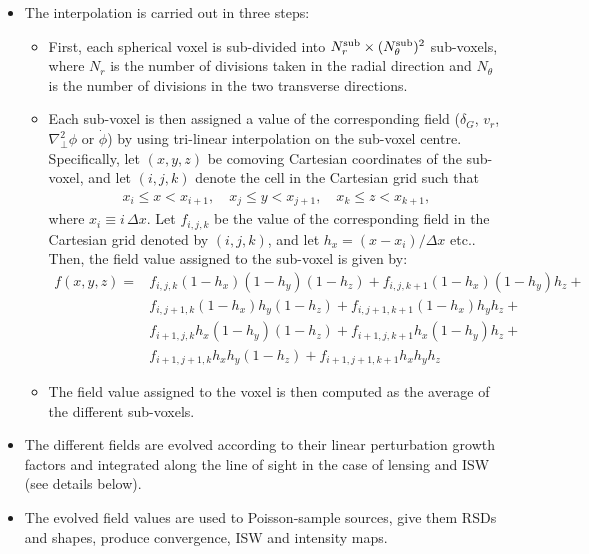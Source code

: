 \documentclass[a4paper,10pt]{article}
\begin{document}
\begin{itemize}
    \item The interpolation is carried out in three steps:
      \begin{itemize}
        \item First, each spherical voxel is sub-divided into 
          $N_r^{\rm sub}\times (N_\theta^{\rm sub})^2$ sub-voxels, where $N_r$ is the
          number of divisions taken in the radial direction and $N_\theta$ is
          the number of divisions in the two transverse directions.
          
        \item Each sub-voxel is then assigned a value of the corresponding field
          ($\delta_G$, $v_r$, $\nabla^2_\perp\phi$ or $\dot{\phi}$) by using
          tri-linear interpolation on the sub-voxel centre. Specifically, let
          $(x,y,z)$ be comoving Cartesian coordinates of the sub-voxel, and let
          $(i,j,k)$ denote the cell in the Cartesian grid such that
          \begin{align}
            x_i\leq x<x_{i+1},\hspace{12pt}x_j\leq y<x_{j+1},\hspace{12pt}
            x_k\leq z<x_{k+1},
          \end{align}
          where $x_i\equiv i\,\Delta x$. Let $f_{i,j,k}$ be the value of the
          corresponding field in the Cartesian grid denoted by $(i,j,k)$, and
          let $h_x=(x-x_i)/\Delta x$ etc.. Then, the field value assigned to the sub-voxel
          is given by:
          \begin{align}
            f(x,y,z)=&
            f_{i,j,k}(1-h_x)(1-h_y)(1-h_z)+
            f_{i,j,k+1}(1-h_x)(1-h_y)h_z+\\
            &f_{i,j+1,k}(1-h_x)h_y(1-h_z)+
            f_{i,j+1,k+1}(1-h_x)h_yh_z+\\
            &f_{i+1,j,k}h_x(1-h_y)(1-h_z)+
            f_{i+1,j,k+1}h_x(1-h_y)h_z+\\
            &f_{i+1,j+1,k}h_xh_y(1-h_z)+
            f_{i+1,j+1,k+1}h_xh_yh_z
          \end{align}
        \item The field value assigned to the voxel is then computed as the average
          of the different sub-voxels.
      \end{itemize}
    \item The different fields are evolved according to their linear perturbation growth
      factors and integrated along the line of sight in the case of lensing and ISW (see 
      details below).
    \item The evolved field values are used to Poisson-sample sources, give them RSDs
      and shapes, produce convergence, ISW and intensity maps.
  \end{itemize}
\end{document}
